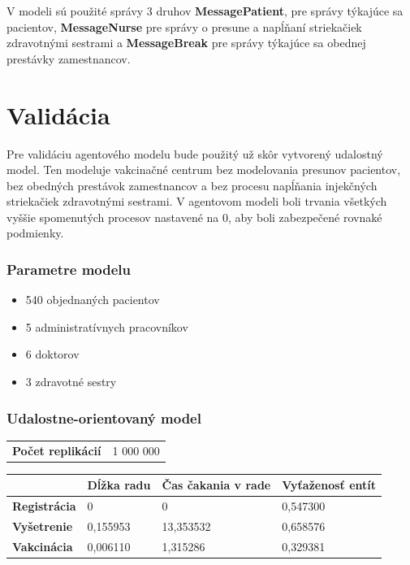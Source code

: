 \documentclass[letterpaper]{article}
\let\stdsection\section							%
\renewcommand\section{\newpage\stdsection}		%
\begin{document}
	V modeli sú použité správy 3 druhov \textbf{MessagePatient}, pre správy týkajúce sa pacientov, \textbf{MessageNurse} pre správy o presune a napĺňaní striekačiek zdravotnými sestrami a \textbf{MessageBreak} pre správy týkajúce sa obednej prestávky zamestnancov.
	
	\section{Validácia}
	
	Pre validáciu agentového modelu bude použitý už skôr vytvorený udalostný model. Ten modeluje vakcinačné centrum bez modelovania presunov pacientov, bez obedných prestávok zamestnancov a bez procesu napĺňania injekčných striekačiek zdravotnými sestrami. V agentovom modeli boli trvania všetkých vyššie spomenutých procesov nastavené na 0, aby boli zabezpečené rovnaké podmienky.
	
	\subsubsection*{Parametre modelu} 
	\begin{itemize}
		\item 540 objednaných pacientov
		\item 5 administratívnych pracovníkov
		\item 6 doktorov
		\item 3 zdravotné sestry
	\end{itemize}
	
	\subsubsection*{Udalostne-orientovaný model}
	
	\noindent\begin{tabular}{ll}
		\textbf{Počet replikácií} & 1 000 000 \\
	\end{tabular}
	
	\begin{table}[hbt!]
		\begin{tabular}{l|lll}
			& \textbf{Dĺžka radu} & \textbf{Čas čakania v rade} & \textbf{Vyťaženosť entít} \\
			\hline
			\textbf{Registrácia} 	& 0                   & 0                           & 0,547300                  \\
			\textbf{Vyšetrenie}  	& 0,155953            & 13,353532                   & 0,658576                  \\
			\textbf{Vakcinácia}  	& 0,006110            & 1,315286                    & 0,329381                 
		\end{tabular}
	\end{table}
	
\end{document}
